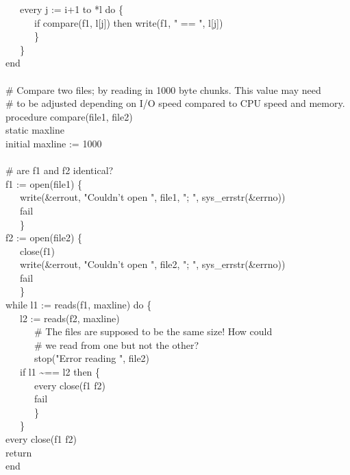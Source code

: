 {\>   \ \ \ every j := i+1 to *l do \{ \\
\>   \ \ \ \ \ \ if compare(f1, l[j]) then write(f1, " == ",
l[j]) \\
\>   \ \ \ \ \ \ \} \\
\>   \ \ \ \} \\
end \\
\ \\
\# Compare two files; by reading in 1000 byte chunks. This value may need\\
\# to be adjusted depending on I/O speed compared to CPU speed and memory. \\
procedure compare(file1, file2) \\
\>   static maxline \\
\>   initial maxline := 1000 \\
\ \\
\>   \# are f1 and f2 identical? \\
\>   f1 := open(file1) {\textbar} \{ \\
\>   \ \ \ write(\&errout, "Couldn't
open ", file1, "; ", sys\_errstr(\&errno)) \\
\>   \ \ \ fail \\
\>   \ \ \ \} \\
\>   f2 := open(file2) {\textbar} \{ \\
\>   \ \ \ close(f1) \\
\>   \ \ \ write(\&errout, "Couldn't
open ", file2, "; ", sys\_errstr(\&errno)) \\
\>   \ \ \ fail \\
\>   \ \ \ \} \\
\>   while l1 := reads(f1, maxline) do \{ \\
\>   \ \ \ l2 := reads(f2, maxline) {\textbar} \\
\>   \ \ \ \ \ \ \# The files are supposed to be the same size! How
could \\
\>   \ \ \ \ \ \ \# we read from one but not the other? \\
\>   \ \ \ \ \ \ stop("Error reading ",
file2) \\
\>   \ \ \ if l1 \~{}== l2 then \{ \\
\>   \ \ \ \ \ \ every close(f1 {\textbar} f2) \\
\>   \ \ \ \ \ \ fail \\
\>   \ \ \ \ \ \ \} \\
\>   \ \ \ \} \\
\>   every close(f1 {\textbar} f2) \\
\>   return \\
end
}

